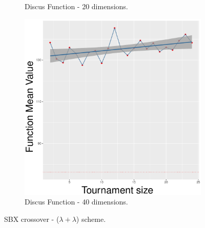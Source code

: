 \begin{figure}[!t]
\begin{subfigure}[b]{0.33\textwidth}
		\caption{Discus Function - 20 dimensions.}
	\end{subfigure}
	\begin{subfigure}[b]{0.33\textwidth}
		\centering
		\includegraphics[width=\textwidth]{img/2n2n-40D/unimodal_2n2n_11_dim_40.pdf}
		\caption{Discus Function - 40 dimensions.}
	\end{subfigure}
	\caption{SBX crossover - ($\lambda + \lambda$) scheme.}
	\label{sbx-11-B}
\end{figure}


